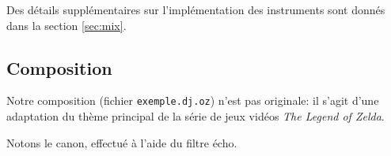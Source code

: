 \documentclass[a4paper,12pt]{article}
\begin{document}
Des détails supplémentaires sur l'implémentation des instruments sont donnés dans la section \ref{sec:mix}.

\subsection{Composition}

Notre composition (fichier \texttt{exemple.dj.oz}) n'est pas originale: il s'agit d'une adaptation du thème principal de la série de jeux vidéos \emph{The Legend of Zelda}.

Notons le canon, effectué à l'aide du filtre écho.
\end{document}
